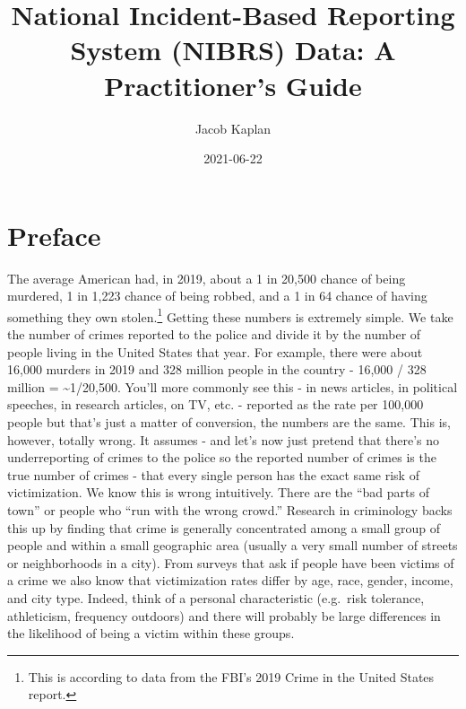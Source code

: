 \documentclass[
  12pt,
  openany]{book}
\title{National Incident-Based Reporting System (NIBRS) Data: A Practitioner's Guide}
\author{Jacob Kaplan}
\date{2021-06-22}
\begin{document}
\maketitle

{
\hypersetup{linkcolor=}
\setcounter{tocdepth}{4}
\tableofcontents
}
\listoftables
\listoffigures
{}
\hypertarget{preface}{%
\chapter{Preface}\label{preface}}

The average American had, in 2019, about a 1 in 20,500 chance of being murdered, 1 in 1,223 chance of being robbed, and a 1 in 64 chance of having something they own stolen.\footnote{This is according to data from the FBI's 2019 Crime in the United States report.} Getting these numbers is extremely simple. We take the number of crimes reported to the police and divide it by the number of people living in the United States that year. For example, there were about 16,000 murders in 2019 and 328 million people in the country - 16,000 / 328 million = \textasciitilde1/20,500. You'll more commonly see this - in news articles, in political speeches, in research articles, on TV, etc. - reported as the rate per 100,000 people but that's just a matter of conversion, the numbers are the same. This is, however, totally wrong. It assumes - and let's now just pretend that there's no underreporting of crimes to the police so the reported number of crimes is the true number of crimes - that every single person has the exact same risk of victimization. We know this is wrong intuitively. There are the ``bad parts of town'' or people who ``run with the wrong crowd.'' Research in criminology backs this up by finding that crime is generally concentrated among a small group of people and within a small geographic area (usually a very small number of streets or neighborhoods in a city). From surveys that ask if people have been victims of a crime we also know that victimization rates differ by age, race, gender, income, and city type. Indeed, think of a personal characteristic (e.g.~risk tolerance, athleticism, frequency outdoors) and there will probably be large differences in the likelihood of being a victim within these groups.
\end{document}
